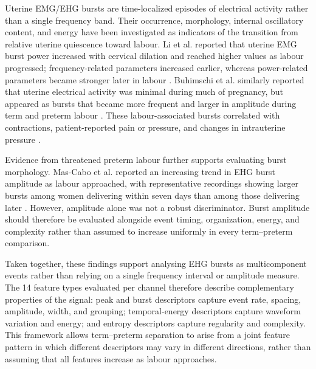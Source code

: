 \documentclass[10pt,letterpaper]{article}
\begin{document}
Uterine EMG/EHG bursts are time-localized episodes of electrical activity rather than a single frequency band. Their occurrence, morphology, internal oscillatory content, and energy have been investigated as indicators of the transition from relative uterine quiescence toward labour. Li et al. reported that uterine EMG burst power increased with cervical dilation and reached higher values as labour progressed; frequency-related parameters increased earlier, whereas power-related parameters became stronger later in labour \cite{li2022uterine}. Buhimschi et al. similarly reported that uterine electrical activity was minimal during much of pregnancy, but appeared as bursts that became more frequent and larger in amplitude during term and preterm labour \cite{Buhimschi1997}. These labour-associated bursts correlated with contractions, patient-reported pain or pressure, and changes in intrauterine pressure \cite{Buhimschi1997}.

Evidence from threatened preterm labour further supports evaluating burst morphology. Mas-Cabo et al. reported an increasing trend in EHG burst amplitude as labour approached, with representative recordings showing larger bursts among women delivering within seven days than among those delivering later \cite{mascabo2019uterine}. However, amplitude alone was not a robust discriminator. Burst amplitude should therefore be evaluated alongside event timing, organization, energy, and complexity rather than assumed to increase uniformly in every term–preterm comparison.

Taken together, these findings support analysing EHG bursts as multicomponent events rather than relying on a single frequency interval or amplitude measure. The 14 feature types evaluated per channel therefore describe complementary properties of the signal: peak and burst descriptors capture event rate, spacing, amplitude, width, and grouping; temporal-energy descriptors capture waveform variation and energy; and entropy descriptors capture regularity and complexity. This framework allows term–preterm separation to arise from a joint feature pattern in which different descriptors may vary in different directions, rather than assuming that all features increase as labour approaches.
\end{document}

